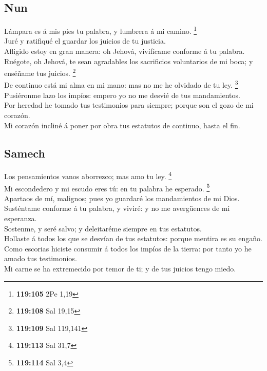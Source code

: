 \hypertarget{nun}{%
\subsection{Nun}\label{nun}}

 Lámpara es á mis pies tu palabra, y lumbrera á mi camino.
\footnote{\textbf{119:105} 2Pe 1,19}\\
 Juré y ratifiqué el guardar los juicios de tu justicia.\\
 Afligido estoy en gran manera: oh Jehová, vivifícame
conforme á tu palabra.\\
 Ruégote, oh Jehová, te sean agradables los sacrificios
voluntarios de mi boca; y enséñame tus juicios. \footnote{\textbf{119:108}
  Sal 19,15}\\
 De continuo está mi alma en mi mano: mas no me he
olvidado de tu ley. \footnote{\textbf{119:109} Sal 119,141}\\
 Pusiéronme lazo los impíos: empero yo no me desvié de tus
mandamientos.\\
 Por heredad he tomado tus testimonios para siempre;
porque son el gozo de mi corazón.\\
 Mi corazón incliné á poner por obra tus estatutos de
continuo, hasta el fin.

\hypertarget{samech}{%
\subsection{Samech}\label{samech}}

 Los pensamientos vanos aborrezco; mas amo tu ley.
\footnote{\textbf{119:113} Sal 31,7}\\
 Mi escondedero y mi escudo eres tú: en tu palabra he
esperado. \footnote{\textbf{119:114} Sal 3,4}\\
 Apartaos de mí, malignos; pues yo guardaré los
mandamientos de mi Dios.\\
 Susténtame conforme á tu palabra, y viviré: y no me
avergüences de mi esperanza.\\
 Sostenme, y seré salvo; y deleitaréme siempre en tus
estatutos.\\
 Hollaste á todos los que se desvían de tus estatutos:
porque mentira es su engaño.\\
 Como escorias hiciste consumir á todos los impíos de la
tierra: por tanto yo he amado tus testimonios.\\
 Mi carne se ha extremecido por temor de ti; y de tus
juicios tengo miedo.

